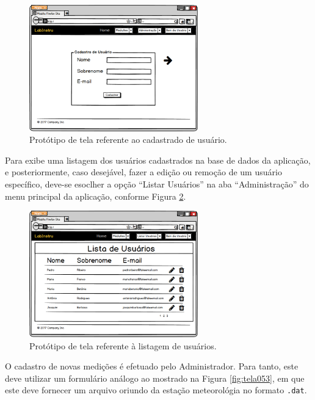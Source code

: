 \begin{figure}[H]
	\centering
	\includegraphics[width=0.65\textwidth]{./img/telas/tela027.png}
	\caption{Protótipo de tela referente ao cadastrado de usuário.} \label{fig:tela027}
\end{figure}

Para exibe uma listagem dos usuários cadastrados na base de dados da aplicação, e posteriormente, caso desejável, fazer a edição ou remoção de um usuário específico, deve-se esoclher a opção ``Listar Usuários'' na aba ``Administração'' do menu principal da aplicação, conforme Figura \ref{fig:tela033}.

\begin{figure}[H]
	\centering
	\includegraphics[width=0.65\textwidth]{./img/telas/tela033.png}
	\caption{Protótipo de tela referente à listagem de usuários.} \label{fig:tela033}
\end{figure}

O cadastro de novas medições é efetuado pelo Administrador. Para tanto, este deve utilizar um formulário análogo ao mostrado na Figura \ref{fig:tela053}, em que este deve fornecer um arquivo oriundo da estação meteorológia no formato \texttt{.dat}.

